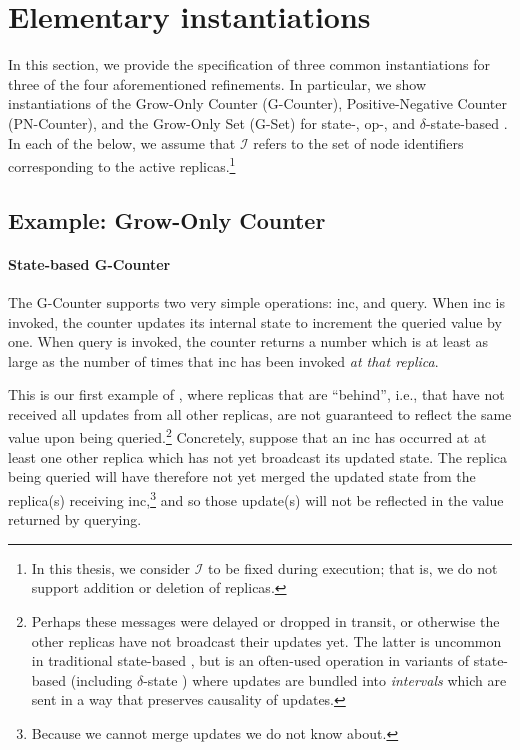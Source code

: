\section{Elementary \CRDT instantiations}
\label{sec:crdt-portfolio}
In this section, we provide the specification of three common \CRDT instantiations
for three of the four aforementioned \CRDT refinements. In particular, we show
instantiations of the Grow-Only Counter (G-Counter), Positive-Negative Counter
(PN-Counter), and the Grow-Only Set (G-Set) for state-, op-, and
$\delta$-state-based \CRDTs. In each of the below, we assume that $\mathcal{I}$
refers to the set of node identifiers corresponding to the active
replicas.\footnote{In this thesis, we consider $\mathcal{I}$ to be fixed during
execution; that is, we do not support addition or deletion of replicas.}

\subsection{Example: Grow-Only Counter}
\label{sec:example-gcounter}

\paragraph{State-based G-Counter}
The G-Counter supports two very simple operations: \textsf{inc}, and query. When
\textsf{inc} is invoked, the counter updates its internal state to increment the
queried value by one. When query is invoked, the counter returns a number which
is at least as large as the number of times that \textsf{inc} has been invoked
\textit{at that replica}.

This is our first example of \SEC, where replicas that are ``behind'', i.e.,
that have not received all updates from all other replicas, are not guaranteed
to reflect the same value upon being queried.\footnote{Perhaps these messages
were delayed or dropped in transit, or otherwise the other replicas have not
broadcast their updates yet. The latter is uncommon in traditional state-based
\CRDTs, but is an often-used operation in variants of state-based \CRDTs
(including $\delta$-state \CRDTs) where updates are bundled into
\emph{intervals} which are sent in a way that preserves causality of updates.}
Concretely, suppose that an \textsf{inc} has occurred at at least one other
replica which has not yet broadcast its updated state. The replica being queried
will have therefore not yet merged the updated state from the replica(s)
receiving \textsf{inc},\footnote{Because we cannot merge updates we do not know
about.} and so those update(s) will not be reflected in the value returned by
querying.

